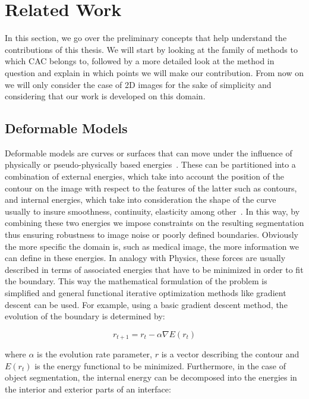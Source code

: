 \newpage
\chapter{Related Work}
\label{sec:related_work}

In this section, we go over the preliminary concepts that help understand the contributions of this thesis. We will start by looking at the family of methods to which CAC belongs to, followed by a more detailed look at the method in question and explain in which points we will make our contribution. From now on we will only consider the case of 2D images for the sake of simplicity and considering that our work is developed on this domain.

\section{Deformable Models}

Deformable models are curves or surfaces that can move under the influence of physically or pseudo-physically based energies~\cite{Gla02}. These can be partitioned into a combination of external energies, which take into account the position of the contour on the image with respect to the features of the latter such as contours, and internal energies, which take into consideration the shape of the curve usually to insure smoothness, continuity, elasticity among other~\cite{Andrew_Nealen,Han03atopology, 1397188}. In this way, by combining these two energies we impose constraints on the resulting segmentation thus ensuring robustness to image noise or poorly defined boundaries. Obviously the more specific the domain is, such as medical image, the more information we can define in these energies. In analogy with Physics, these forces are usually described in terms of associated energies that have to be minimized in order to fit the boundary.
This way the mathematical formulation of the problem is simplified and general functional iterative optimization methods like gradient descent can be used. For example, using a basic gradient descent method, the evolution
of the boundary is determined by:

\begin{equation}
	r_{t+1}=r_{t}-\alpha \nabla E(r_t)
\end{equation}

where $\alpha$ is the evolution rate parameter, $r$ is a vector describing the contour
and $E(r_t)$ is the energy functional to be minimized. Furthermore, in the case of object segmentation, the internal energy can be decomposed into the energies in the interior and exterior parts of an interface:

